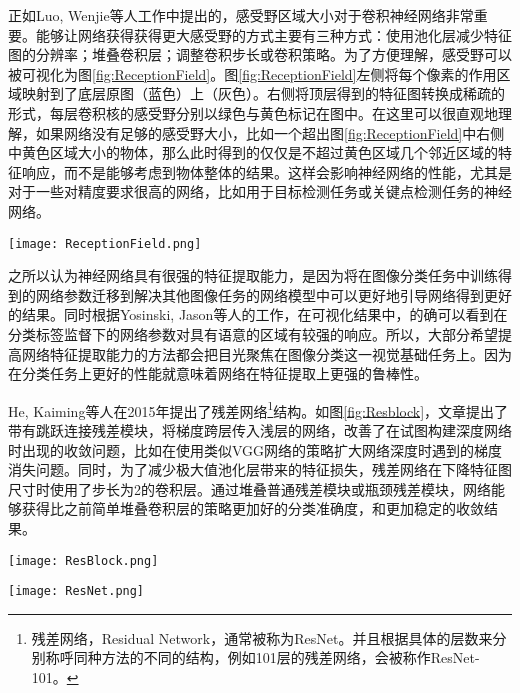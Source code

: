 正如Luo, Wenjie等人工作\cite{luo2016understanding}中提出的，感受野区域大小对于卷积神经网络非常重要。能够让网络获得获得更大感受野的方式主要有三种方式：使用池化层减少特征图的分辨率；堆叠卷积层；调整卷积步长或卷积策略。为了方便理解，感受野可以被可视化为图\ref{fig:ReceptionField}。图\ref{fig:ReceptionField}左侧将每个像素的作用区域映射到了底层原图（蓝色）上（灰色）。右侧将顶层得到的特征图转换成稀疏的形式，每层卷积核的感受野分别以绿色与黄色标记在图中。在这里可以很直观地理解，如果网络没有足够的感受野大小，比如一个超出图\ref{fig:ReceptionField}中右侧中黄色区域大小的物体，那么此时得到的仅仅是不超过黄色区域几个邻近区域的特征响应，而不是能够考虑到物体整体的结果。这样会影响神经网络的性能，尤其是对于一些对精度要求很高的网络，比如用于目标检测任务或关键点检测任务的神经网络。

\begin{figure*}[htbp]	
	\centering
	\texttt{[image: ReceptionField.png]}
	\caption{两种可视化感受野的方法\cite{fang2017reception}}
	\label{fig:ReceptionField}
\end{figure*}

之所以认为神经网络具有很强的特征提取能力，是因为将在图像分类任务中训练得到的网络参数迁移到解决其他图像任务的网络模型中可以更好地引导网络得到更好的结果\cite{mishkin2015all}。同时根据Yosinski, Jason等人的工作\cite{yosinski2015understanding}，在可视化结果中，的确可以看到在分类标签监督下的网络参数对具有语意的区域有较强的响应。所以，大部分希望提高网络特征提取能力的方法都会把目光聚焦在图像分类这一视觉基础任务上。因为在分类任务上更好的性能就意味着网络在特征提取上更强的鲁棒性。

He, Kaiming等人在2015年提出了残差网络\footnote{残差网络，Residual Network，通常被称为ResNet。并且根据具体的层数来分别称呼同种方法的不同的结构，例如101层的残差网络，会被称作ResNet-101。}结构\cite{He2015Deep}。如图\ref{fig:Resblock}，文章提出了带有跳跃连接残差模块，将梯度跨层传入浅层的网络，改善了在试图构建深度网络时出现的收敛问题，比如在使用类似VGG网络\cite{simonyan2014very}的策略扩大网络深度时遇到的梯度消失问题。同时，为了减少极大值池化层带来的特征损失，残差网络在下降特征图尺寸时使用了步长为2的卷积层。通过堆叠普通残差模块或瓶颈残差模块，网络能够获得比之前简单堆叠卷积层的策略更加好的分类准确度，和更加稳定的收敛结果。

\begin{figure*}[htbp]	
	\centering
	\texttt{[image: ResBlock.png]}
	\caption{残差模块结构：左图为普通残差模块，右图为瓶颈残差模块}
	\label{fig:Resblock}
\end{figure*}
\begin{figure*}[htbp]	
	\centering
	\texttt{[image: ResNet.png]}
	\caption{残差网络结构策略}
	\label{fig:ResNet}
\end{figure*}

